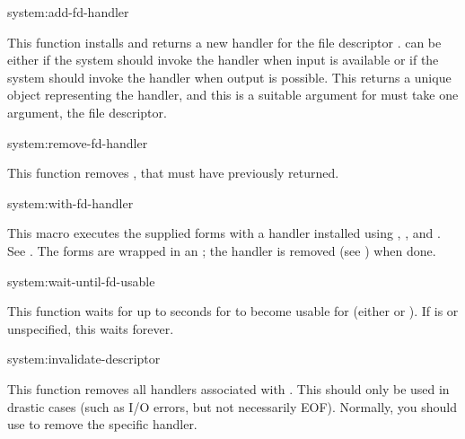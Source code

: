 \begin{defun}{system:}{add-fd-handler}{%
    }
  
  This function installs and returns a new handler for the file
  descriptor .   can be either  if
  the system should invoke the handler when input is available or
   if the system should invoke the handler when output is
  possible.  This returns a unique object representing the handler,
  and this is a suitable argument for 
   must take one argument, the file descriptor.
\end{defun}

\begin{defun}{system:}{remove-fd-handler}{}

  This function removes , that  must
  have previously returned.
\end{defun}

\begin{defmac}{system:}{with-fd-handler}{%
    }
      
  This macro executes the supplied forms with a handler installed
  using , , and .  See
  .  The forms are wrapped in an
  ;  the handler is removed (see
  ) when done.
\end{defmac}

\begin{defun}{system:}{wait-until-fd-usable}{%
    }
      
  This function waits for up to  seconds for  to
  become usable for  (either  or
  ).  If  is \nil{} or unspecified, this
  waits forever.
\end{defun}

\begin{defun}{system:}{invalidate-descriptor}{}
  
  This function removes all handlers associated with .  This
  should only be used in drastic cases (such as I/O errors, but not
  necessarily EOF).  Normally, you should use 
  to remove the specific handler.
\end{defun}




